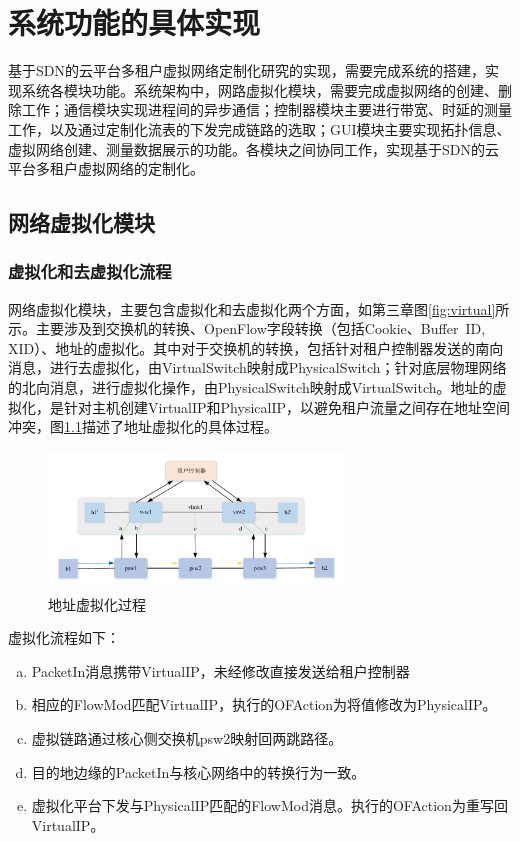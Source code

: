 \chapter{系统功能的具体实现}
基于SDN的云平台多租户虚拟网络定制化研究的实现，需要完成系统的搭建，实现系统各模块功能。系统架构中，网路虚拟化模块，需要完成虚拟网络的创建、删除工作；通信模块实现进程间的异步通信；控制器模块主要进行带宽、时延的测量工作，以及通过定制化流表的下发完成链路的选取；GUI模块主要实现拓扑信息、虚拟网络创建、测量数据展示的功能。各模块之间协同工作，实现基于SDN的云平台多租户虚拟网络的定制化。
\section{网络虚拟化模块}
\subsection{虚拟化和去虚拟化流程}
网络虚拟化模块，主要包含虚拟化和去虚拟化两个方面，如第三章图\ref{fig:virtual}所示。主要涉及到交换机的转换、OpenFlow字段转换（包括Cookie、Buffer\ ID, XID）、地址的虚拟化。其中对于交换机的转换，包括针对租户控制器发送的南向消息，进行去虚拟化，由VirtualSwitch映射成PhysicalSwitch；针对底层物理网络的北向消息，进行虚拟化操作，由PhysicalSwitch映射成VirtualSwitch。地址的虚拟化，是针对主机创建VirtualIP和PhysicalIP，以避免租户流量之间存在地址空间冲突，图\ref{fig:addr-vir}描述了地址虚拟化的具体过程。

\begin{figure}[!htb]
  \centering
  \includegraphics[width=0.7\textwidth]{logo/addr_virt}
  \caption{地址虚拟化过程}
  \label{fig:addr-vir}
\end{figure}

虚拟化流程如下：
\begin{enumerate}[a)]
\item PacketIn消息携带VirtualIP，未经修改直接发送给租户控制器
\item 相应的FlowMod匹配VirtualIP，执行的OFAction为将值修改为PhysicalIP。
\item 虚拟链路通过核心侧交换机psw2映射回两跳路径。
\item 目的地边缘的PacketIn与核心网络中的转换行为一致。
\item 虚拟化平台下发与PhysicalIP匹配的FlowMod消息。执行的OFAction为重写回VirtualIP。
\end{enumerate}

